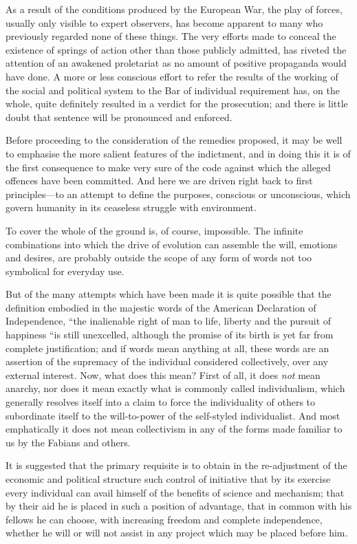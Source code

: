 \documentclass{book}
\begin{document}
As a result of the conditions produced by the European War, the play of forces, usually only visible to expert observers, has become apparent to many who previously regarded none of these things. The very efforts made to conceal the existence of springs of action other than those publicly admitted, has riveted the attention of an awakened proletariat as no amount of positive propaganda would have done. A more or less conscious effort to refer the results of the working of the social and political system to the Bar of individual requirement has, on the whole, quite definitely resulted in a verdict for the prosecution; and there is little doubt that sentence will be pronounced and enforced.

Before proceeding to the consideration of the remedies proposed, it may be well to emphasise the more salient features of the indictment, and in doing this it is of the first consequence to make very sure of the code against which the alleged offences have been committed. And here we are driven right back to first principles—to an attempt to define the purposes, conscious or unconscious, which govern humanity in its ceaseless struggle with environment.

To cover the whole of the ground is, of course, impossible. The infinite combinations into which the drive of evolution can assemble the will, emotions and desires, are probably outside the scope of any form of words not too symbolical for everyday use.

But of the many attempts which have been made it is quite possible that the definition embodied in the majestic words of the American Declaration of Independence, “the inalienable right of man to life, liberty and the pursuit of happiness “is still unexcelled, although the promise of its birth is yet far from complete justification; and if words mean anything at all, these words are an assertion of the supremacy of the individual considered collectively, over any external interest. Now, what does this mean? First of all, it does \emph{not} mean anarchy, nor does it mean exactly what is commonly called individualism, which generally resolves itself into a claim to force the individuality of others to subordinate itself to the will-to-power of the self-styled individualist. And most emphatically it does not mean collectivism in any of the forms made familiar to us by the Fabians and others.

It is suggested that the primary requisite is to obtain in the re-adjustment of the economic and political structure such control of initiative that by its exercise every individual can avail himself of the benefits of science and mechanism; that by their aid he is placed in such a position of advantage, that in common with his fellows he can choose, with increasing freedom and complete independence, whether he will or will not assist in any project which may be placed before him.
\end{document}
